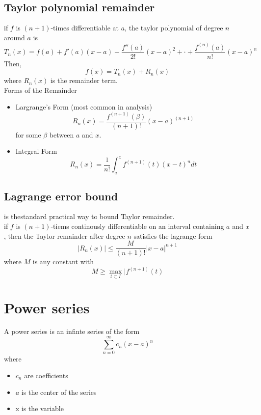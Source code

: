 \documentclass{article}
\begin{document}
                                \subsection{Taylor polynomial remainder}
                                    if \(f\) is \((n + 1)\)-times differentiable at \(a\), the taylor polynomial of degree \(n\) around \(a\) is 
                                        \[T_n(x) = f(a) + f'(a)(x - a) + \frac{f''(a)}{2!}{(x - a)}^{2} + \cdot + \frac{f^{(n)}(a)}{n!}{(x - a)}^{n} \]
                                    Then,
                                        \[f(x)  = T_n(x) + R_n(x)\]
                                    where \(R_n(x)\) is the remainder term.\\ 
                                    Forms of the Remainder 
                                    \begin{itemize}
                                        \item Largrange's Form (most common in analysis)
                                            \[R_n(x) = \frac{f^{(n + 1)}(\beta)}{(n + 1)!} {(x - a)}^{(n + 1)}\]
                                            for some \(\beta\) between \(a\) and \(x\).
                                        \item Integral Form 
                                            \[R_n(x) = \frac{1}{n!} \int_{a}^{x} f^{(n + 1)}(t){(x - t)}^n dt\]
                                    \end{itemize}
                                \subsection{Lagrange error bound}
                                    is thestandard practical way to bound Taylor remainder. \\
                                    if \(f\) is \((n + 1)\)-tiems continously differentiable on an interval containing \(a\) and \(x\), then the Taylor remainder after degree \(n\) satisfies the lagrange form 
                                        \[|R_n(x)| \leq \frac{M}{(n+1)!} |x - a|^{n+1}\]
                                    where \(M\) is any constant with 
                                        \[M \geq \max_{t \subset I}|f^{(n + 1)}(t)\]
                        \section{Power series}
                                    A power series is an infinte series of the form 
                                        \[\sum_{n=0}^{\infty} c_n {(x - a)}^n\]
                                        where 
                                        \begin{itemize}
                                            \item \(c_n\) are coefficients 
                                            \item \(a\) is the center of the series
                                            \item x is the variable
                                        \end{itemize}
\end{document}
